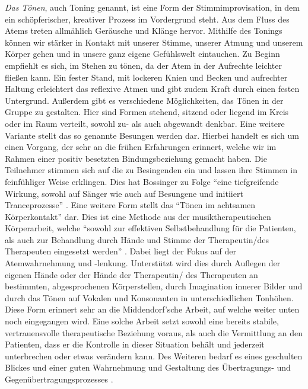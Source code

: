 \emph{Das Tönen}, auch Toning genannt, ist eine Form der Stimmimprovisation, in dem ein schöpferischer, kreativer Prozess im Vordergrund steht. Aus dem Fluss des Atems treten allmählich Geräusche und Klänge hervor. Mithilfe des Tonings können wir stärker in Kontakt mit unserer Stimme, unserer Atmung und unserem Körper gehen und in unsere ganz eigene Gefühlswelt eintauchen. Zu Beginn empfiehlt es sich, im Stehen zu tönen, da der Atem in der Aufrechte leichter fließen kann. Ein fester Stand, mit lockeren Knien und Becken und aufrechter Haltung erleichtert das reflexive Atmen und gibt zudem Kraft durch einen festen Untergrund. Außerdem gibt es verschiedene Möglichkeiten, das Tönen in der Gruppe zu gestalten. Hier sind Formen stehend, sitzend oder liegend im Kreis oder im Raum verteilt, sowohl zu- als auch abgewandt denkbar. Eine weitere Variante stellt das so genannte Besungen werden dar. Hierbei handelt es sich um einen Vorgang, der sehr an die frühen Erfahrungen erinnert, welche wir im Rahmen einer positiv besetzten Bindungsbeziehung gemacht haben. Die Teilnehmer stimmen sich auf die zu Besingenden ein und lassen ihre Stimmen in feinfühliger Weise erklingen. Dies hat Bossinger zu Folge "`eine tiefgreifende Wirkung, sowohl auf Sänger wie auch auf Besungene und initiiert Tranceprozesse"' \autocite[275]{bossinger2006}. Eine weitere Form stellt das "`Tönen im achtsamen Körperkontakt"' \autocite[208]{rittner2008} dar. Dies ist eine Methode aus der musiktherapeutischen Körperarbeit, welche "`sowohl zur effektiven Selbstbehandlung für die Patienten, als auch zur Behandlung durch Hände und Stimme der Therapeutin/des Therapeuten eingesetzt werden"' \autocite[208]{rittner2008}. Dabei liegt der Fokus auf der Atemwahrnehmung und -lenkung. Unterstützt wird dies durch Auflegen der eigenen Hände oder der Hände der Therapeutin/ des Therapeuten an bestimmten, abgesprochenen Körperstellen, durch Imagination innerer Bilder und durch das Tönen auf Vokalen und Konsonanten in unterschiedlichen Tonhöhen. Diese Form erinnert sehr an die Middendorf'sche Arbeit, auf welche weiter unten noch eingegangen wird. Eine solche Arbeit setzt sowohl eine bereits stabile, vertrauensvolle therapeutische Beziehung voraus, als auch die Vermittlung an den Patienten, dass er die Kontrolle in dieser Situation behält und jederzeit unterbrechen oder etwas verändern kann. Des Weiteren bedarf es eines geschulten Blickes und einer guten Wahrnehmung und Gestaltung des Übertragungs- und Gegenübertragungsprozesses \autocite[vgl.][60]{rittner2012}.

